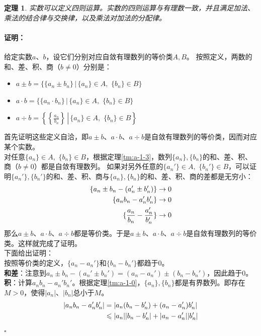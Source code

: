 \documentclass[12pt,UTF8]{ctexbook}
\newtheorem{tm}{定理}[section]
\newenvironment{proof2}{\paragraph{\textbf{证明：}}}{\hfill$\square$}
\begin{document}
\begin{appendix}
\begin{tm}\label{tm:a-1-20}
    实数可以定义四则运算。实数的四则运算与有理数一致，并且满足加法、乘法的结合律与交换律，以及乘法对加法的分配律。
\end{tm}
\begin{proof2}
    给定实数$a$、$b$，设它们分别对应自敛有理数列的等价类$A,B$。
    按照定义，两数的和、差、积、商（$b\neq 0$）分别是：
    \begin{itemize}
        \item $a \pm b = \{\{a_n \pm b_n\} \, |\, \{a_n\}\in A,\,\,\{b_n\}\in B \}$
        \item $a\cdot b = \{\{a_n \cdot b_n\} \, |\, \{a_n\}\in A,\,\,\{b_n\}\in B \}$
        \item $a\div b = \left.\left\{\left\{\frac{a_n}{b_n}\right\} \, \right|\, \{a_n\}\in A,\,\,\{b_n\}\in B \right\}$
    \end{itemize}
    首先证明这些定义自洽，即$a\pm b$、$a\cdot b$、$a\div b$是自敛有理数列的等价类，因而对应某个实数。\\
    对任意$\{a_n\}\in A,\,\,\{b_n\}\in B$，根据定理\ref{tm:a-1-3}，数列$\{a_n\}, \{b_n\}$的和、差、积、商（$b\neq 0$）都是自敛有理数列。
    如果对另外任意的$\{a_n'\}\in A,\,\,\{b_n'\}\in B$，可以证明$\{a_n'\}, \{b_n'\}$的和、差、积、商与$\{a_n\}, \{b_n\}$的和、差、积、商的差都是无穷小：
    \begin{align}
        \{a_n \pm b_n - (a_n' \pm b_n')\} &\to 0 \notag \\
        \{a_nb_n - a_n'b_n'\} &\to 0 \notag \\
        \{\frac{a_n}{b_n} - \frac{a_n'}{b_n'}\} &\to 0 \notag 
    \end{align}
    那么$a\pm b$、$a\cdot b$、$a\div b$都是等价类。于是$a\pm b$、$a\cdot b$、$a\div b$是自敛有理数列的等价类。这样就完成了证明。\\
    下面给出证明：\\
    按照等价类的定义，$\{a_n - a_n'\}$和$\{b_n - b_n'\}$都趋于$0$。\\
    \textbf{和差}：注意到$a_n \pm b_n - (a_n' \pm b_n') = (a_n - a_n') \pm (b_n - b_n')$，因此趋于$0$。\\
    \textbf{积}：计算$a_nb_n - a_n'b_n'$。根据定理\ref{tm:a-1-0}，$\{a_n\}, \{b_n\}$都是有界数列。即存在$M>0$，使得$|a_n|$、$|b_n|$总小于$M$。
    \begin{align}
        |a_nb_n - a_n'b_n'| &= |a_n(b_n - b_n') + (a_n - a_n')b_n'| \notag \\
        &\leqslant |a_n||b_n - b_n'| + |a_n - a_n'||b_n'| \notag \\

\end{align}
\end{proof2}
\end{appendix}
\end{document}
